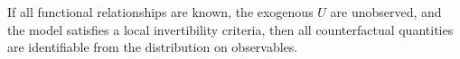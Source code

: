 If all functional relationships are known, the exogenous $U$ are unobserved, and the model satisfies a local invertibility criteria, then all counterfactual quantities are identifiable from the distribution on observables.



